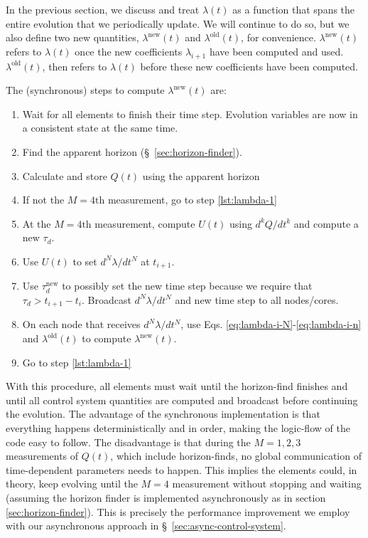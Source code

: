 \begin{bibunit}[unsrtnat]
In the previous section, we discuss and treat $\lambda(t)$ as a function that
spans the entire evolution that we periodically update. We will continue to do
so, but we also define two new quantities, $\lambda^\mathrm{new}(t)$ and
$\lambda^\mathrm{old}(t)$, for convenience. $\lambda^\mathrm{new}(t)$ refers to
$\lambda(t)$ once the new coefficients $\lambda_{i+1}$ have been computed and
used. $\lambda^\mathrm{old}(t)$, then refers to $\lambda(t)$ before these new
coefficients have been computed.

The (synchronous) steps to compute $\lambda^\mathrm{new}(t)$ are:

\begin{enumerate}
  \item \label{lst:lambda-1} Wait for all elements to finish their time step.
  Evolution variables are now in a consistent state at the same time.
  \item Find the apparent horizon (\S~\ref{sec:horizon-finder}).
  \item Calculate and store $Q(t)$ using the apparent horizon
  \item If not the $M=4\textrm{th}$ measurement, go to step \ref{lst:lambda-1}
  \item At the $M=4\textrm{th}$ measurement, compute $U(t)$ using
  $d^{k}Q/dt^{k}$ and compute a new $\tau_d$.
  \item Use $U(t)$ to set $d^{N}\lambda/dt^{N}$ at $t_{i+1}$.
  \item Use $\tau^\mathrm{new}_d$ to possibly set the new time step because we
  require that $\tau_d > t_{i+1} - t_i$. Broadcast $d^{N}\lambda/dt^{N}$ and new
  time step to all nodes/cores.
  \item On each node that receives $d^{N}\lambda/dt^{N}$, use Eqs.
  \eqref{eq:lambda-i-N}-\eqref{eq:lambda-i-n} and $\lambda^\mathrm{old}(t)$
  to compute $\lambda^\mathrm{new}(t)$.
  \item Go to step \ref{lst:lambda-1}
\end{enumerate}

With this procedure, all elements must wait until the horizon-find finishes and
until all control system quantities are computed and broadcast before continuing
the evolution. The advantage of the synchronous implementation is that
everything happens deterministically and in order, making the logic-flow of the
code easy to follow. The disadvantage is that during the $M=1,2,3$ measurements
of $Q(t)$, which include horizon-finds, no global communication of
time-dependent parameters needs to happen. This implies the elements could, in
theory, keep evolving until the $M=4$ measurement without stopping and waiting
(assuming the horizon finder is implemented asynchronously as in section
\ref{sec:horizon-finder}). This is precisely the performance improvement we
employ with our asynchronous approach in \S~\ref{sec:async-control-system}.


\end{bibunit}
